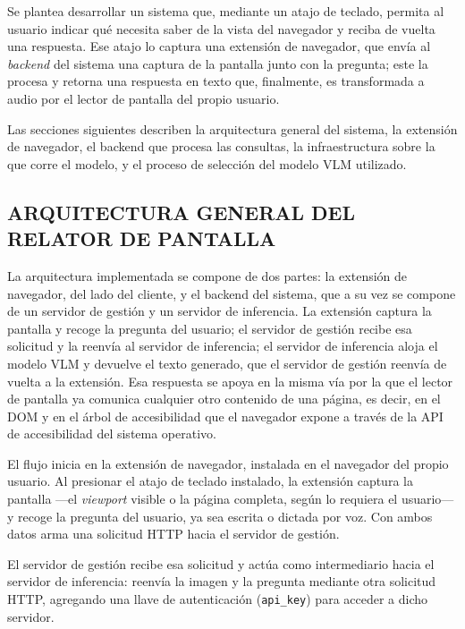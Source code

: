 
Se plantea desarrollar un sistema que, mediante un atajo de teclado, permita al usuario indicar qué necesita saber de la vista del navegador y reciba de vuelta una respuesta. Ese atajo lo captura una extensión de navegador, que envía al \textit{backend} del sistema una captura de la pantalla junto con la pregunta; este la procesa y retorna una respuesta en texto que, finalmente, es transformada a audio por el lector de pantalla del propio usuario.

Las secciones siguientes describen la arquitectura general del sistema, la extensión de navegador, el backend que procesa las consultas, la infraestructura sobre la que corre el modelo, y el proceso de selección del modelo VLM utilizado.

\subsection{ARQUITECTURA GENERAL DEL RELATOR DE PANTALLA}

La arquitectura implementada se compone de dos partes: la extensión de navegador, del lado del cliente, y el backend del sistema, que a su vez se compone de un servidor de gestión y un servidor de inferencia. La extensión captura la pantalla y recoge la pregunta del usuario; el servidor de gestión recibe esa solicitud y la reenvía al servidor de inferencia; el servidor de inferencia aloja el modelo VLM y devuelve el texto generado, que el servidor de gestión reenvía de vuelta a la extensión. Esa respuesta se apoya en la misma vía por la que el lector de pantalla ya comunica cualquier otro contenido de una página, es decir, en el DOM y en el árbol de accesibilidad que el navegador expone a través de la API de accesibilidad del sistema operativo.

El flujo inicia en la extensión de navegador, instalada en el navegador del propio usuario. Al presionar el atajo de teclado instalado, la extensión captura la pantalla —el \textit{viewport} visible o la página completa, según lo requiera el usuario— y recoge la pregunta del usuario, ya sea escrita o dictada por voz. Con ambos datos arma una solicitud HTTP hacia el servidor de gestión.

El servidor de gestión recibe esa solicitud y actúa como intermediario hacia el servidor de inferencia: reenvía la imagen y la pregunta mediante otra solicitud HTTP, agregando una llave de autenticación (\texttt{api\_key}) para acceder a dicho servidor.

